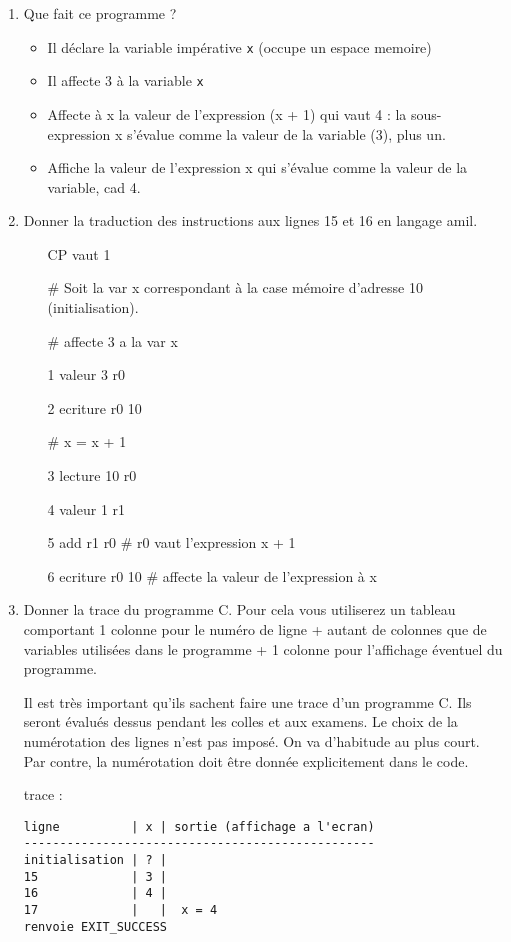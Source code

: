 \begin{enumerate}
\item Que fait ce programme ?
  \begin{correction}
    \begin{itemize}
    \item Il déclare la variable impérative \verb|x| (occupe un espace memoire)
    \item Il affecte 3 à la variable \verb|x|
    \item Affecte à x la valeur de l'expression (x + 1) qui vaut 4 : la sous-expression x s'évalue comme la valeur de la variable (3), plus un. 
    \item Affiche la valeur de l'expression x qui s'évalue comme la valeur de la variable, cad 4.
    \end{itemize}
  \end{correction}
\item Donner la traduction des instructions aux lignes 15 et 16 en langage amil.
  \begin{correction}
    \begin{itemize}
    \item[] CP vaut 1
    \item[\#]  Soit la var x correspondant à la case mémoire d'adresse 10 (initialisation).
    \item[\#] affecte 3 a la var x
    \item[1] valeur 3 r0
    \item[2] ecriture r0 10
    \item[\#] x = x + 1
    \item[3] lecture 10 r0
    \item[4] valeur 1 r1
    \item[5] add r1 r0 \# r0 vaut l'expression x + 1
    \item[6] ecriture r0 10 \# affecte la valeur de l'expression à x
    \end{itemize}
  \end{correction}
\item Donner la trace du programme C. Pour cela vous utiliserez un tableau comportant 1 colonne pour le numéro de ligne + autant de colonnes que de variables utilisées dans le programme + 1 colonne pour l'affichage éventuel du programme.
  \begin{correction}
    Il est très important qu'ils sachent faire une trace d'un programme C. Ils seront évalués dessus pendant les colles et aux examens. Le choix de la numérotation des lignes n'est pas imposé. On va d'habitude au plus court. Par contre, la numérotation doit être donnée explicitement dans le code.

trace :\\
\begin{verbatim}
ligne          | x | sortie (affichage a l'ecran)
-------------------------------------------------
initialisation | ? |
15             | 3 |
16             | 4 |
17             |   |  x = 4
renvoie EXIT_SUCCESS
\end{verbatim}
  \end{correction}
\end{enumerate}

